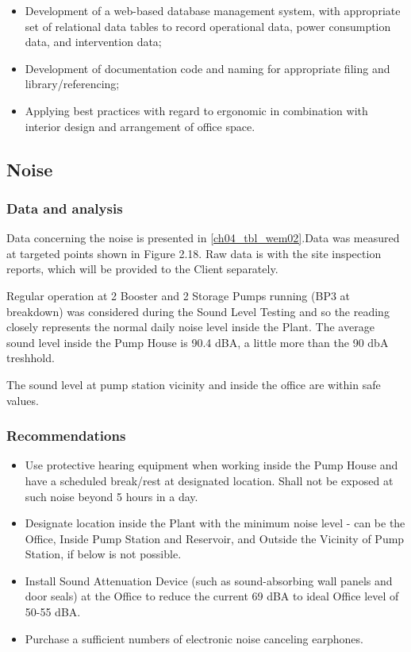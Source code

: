 \begin{itemize}
\item Development of a web-based database management system, with appropriate set of relational data tables to record operational data, power consumption data, and intervention data;

\item Development of documentation code and naming for appropriate filing and library/referencing;

\item Applying best practices with regard to ergonomic in combination with interior design and arrangement of office space.

\end{itemize}





\subsection{Noise}\label{aq06}
\subsubsection{Data and analysis}
Data concerning the noise is presented in \ref{ch04_tbl_wem02}.Data was measured at targeted points shown in Figure 2.18. Raw data is with the site inspection reports, which will be provided to the Client separately. 



Regular operation at 2 Booster and 2 Storage Pumps running (BP3 at breakdown) was considered during the Sound Level Testing and so the reading closely represents the normal daily noise level inside the Plant. The average sound level inside the Pump House is 90.4 dBA, a little more than the 90 dbA treshhold. 

The sound level at pump station vicinity and inside the office are within safe values.

\subsubsection{Recommendations}

\begin{itemize}
	\item	Use protective hearing equipment when working inside the Pump House and have a scheduled break/rest at designated location. Shall not be exposed at such noise beyond 5 hours in a day.
	\item	Designate location inside the Plant with the minimum noise level - can be the Office, Inside Pump Station and Reservoir, and Outside the Vicinity of Pump Station, if below is not possible.
	\item	 Install Sound Attenuation Device (such as sound-absorbing wall panels and door seals) at the Office to reduce the current 69 dBA to ideal Office level of 50-55 dBA.
	
	\item Purchase a sufficient numbers of electronic noise canceling earphones.
\end{itemize}